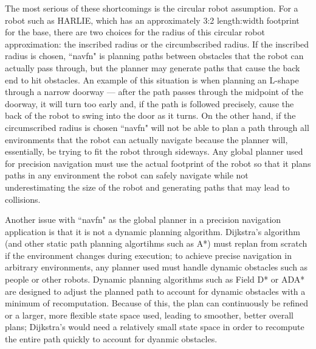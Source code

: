 The most serious of these shortcomings is the circular robot assumption. For a robot such as HARLIE, which has an approximately 3:2 length:width footprint for the base, there are two choices for the radius of this circular robot approximation: the inscribed radius or the circumbscribed radius. If the inscribed radius is chosen, ``navfn" is planning paths between obstacles that the robot can actually pass through, but the planner may generate paths that cause the back end to hit obstacles. An example of this situation is when planning an L-shape through a narrow doorway --- after the path passes through the midpoint of the doorway, it will turn too early and, if the path is followed precisely, cause the back of the robot to swing into the door as it turns. On the other hand, if the circumscribed radius is chosen ``navfn" will not be able to plan a path through all environments that the robot can actually navigate because the planner will, essentially, be trying to fit the robot through sideways. Any global planner used for precision navigation must use the actual footprint of the robot so that it plans paths in any environment the robot can safely navigate while not underestimating the size of the robot and generating paths that may lead to collisions.

Another issue with ``navfn" as the global planner in a precision navigation application is that it is not a dynamic planning algorithm. Dijkstra's algorithm (and other static path planning algortihms such as A*) must replan from scratch if the environment changes during execution; to achieve precise navigation in arbitrary environments, any planner used must handle dynamic obstacles such as people or other robots. Dynamic planning algorithms such as Field D* \autocite{FieldDStar} or ADA* \autocites{ADAStar}{DBLP:journals/ai/LikhachevFGST08} are designed to adjust the planned path to account for dynamic obstacles with a minimum of recomputation. Because of this, the plan can continuously be refined or a larger, more flexible state space used, leading to smoother, better overall plans; Dijkstra's would need a relatively small state space in order to recompute the entire path quickly to account for dyanmic obstacles.

